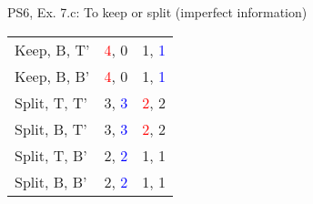 \begin{frame}{PS6, Ex. 7.c: To keep or split (imperfect information)}
\begin{multicols}{2}
\begin{table}
\begin{tabular}{l|c|c|}
        Keep, B, T' & \textcolor{red}{4}, 0 & 1, \textcolor{blue}{1} \\\cline{2-3}
        Keep, B, B' & \textcolor{red}{4}, 0 & 1, \textcolor{blue}{1} \\\cline{2-3}
        Split, T, T' & 3, \textcolor{blue}{3} & \textcolor{red}{2}, 2 \\\cline{2-3}
        Split, B, T' & 3, \textcolor{blue}{3} & \textcolor{red}{2}, 2 \\\cline{2-3}
        Split, T, B' & 2, \textcolor{blue}{2} & 1, 1 \\\cline{2-3}
        Split, B, B' & 2, \textcolor{blue}{2} & 1, 1 \\\cline{2-3}
      \end{tabular}
    \end{table}
    \vfill\null
  \end{multicols}
\end{frame}
